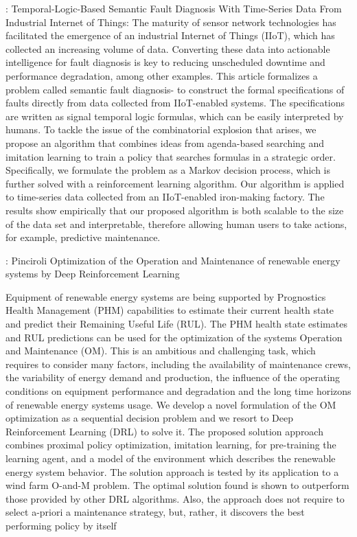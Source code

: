 \documentclass{article}
\begin{document}
	\cite{Chen-2021-Temporal}: Temporal-Logic-Based Semantic Fault Diagnosis With Time-Series Data From Industrial Internet of Things:
	The maturity of sensor network technologies has facilitated the emergence of an industrial Internet of Things (IIoT), which has collected an increasing volume of data. Converting these data into actionable intelligence for fault diagnosis is key to reducing unscheduled downtime and performance degradation, among other examples. This article formalizes a problem called semantic fault diagnosis- to construct the formal specifications of faults directly from data collected from IIoT-enabled systems. The specifications are written as signal temporal logic formulas, which can be easily interpreted by humans. To tackle the issue of the combinatorial explosion that arises, we propose an algorithm that combines ideas from agenda-based searching and imitation learning to train a policy that searches formulas in a strategic order. Specifically, we formulate the problem as a Markov decision process, which is further solved with a reinforcement learning algorithm. Our algorithm is applied to time-series data collected from an IIoT-enabled iron-making factory. The results show empirically that our proposed algorithm is both scalable to the size of the data set and interpretable, therefore allowing human users to take actions, for example, predictive maintenance.
	
	\cite{Pinciroli2022-752}: Pinciroli Optimization of the Operation and Maintenance of renewable energy systems by Deep Reinforcement Learning
	
	Equipment of renewable energy systems are being supported by Prognostics  Health Management (PHM) capabilities to estimate their current health state and predict their Remaining Useful Life (RUL). The PHM health state estimates and RUL predictions can be used for the optimization of the systems Operation and Maintenance (OM). This is an ambitious and challenging task, which requires to consider many factors, including the availability of maintenance crews, the variability of energy demand and production, the influence of the operating conditions on equipment performance and degradation and the long time horizons of renewable energy systems usage. We develop a novel formulation of the OM optimization as a sequential decision problem and we resort to Deep Reinforcement Learning (DRL) to solve it. The proposed solution approach combines proximal policy optimization, imitation learning, for pre-training the learning agent, and a model of the environment which describes the renewable energy system behavior. The solution approach is tested by its application to a wind farm O-and-M problem. The optimal solution found is shown to outperform those provided by other DRL algorithms. Also, the approach does not require to select a-priori a maintenance strategy, but, rather, it discovers the best performing policy by itself
	
\end{document}
